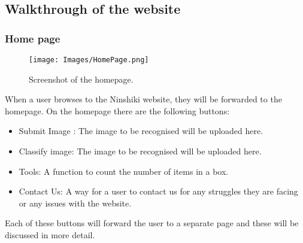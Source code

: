 \documentclass[a4paper, 12pt]{article}
\begin{document}
\subsection{Walkthrough of the website}
\subsubsection{Home page}
\begin{figure}[h!]
\texttt{[image: Images/HomePage.png]}
\centering
\caption{Screenshot of the homepage.}
\end{figure}
When a user browses to the Ninshiki website, they will be forwarded to the homepage. On the homepage there are the following buttons:
\begin{itemize}
\item Submit Image : The image to be recognised will be uploaded here.
\item Classify image: The image to be recognised will be uploaded here.
\item Tools: A function to count the number of items in a box.
\item Contact Us: A way for a user to contact us for any struggles they are facing or any issues with the website.
\end{itemize}
Each of these buttons will forward the user to a separate page and these will be discussed in more detail.
\pagebreak
\end{document}
